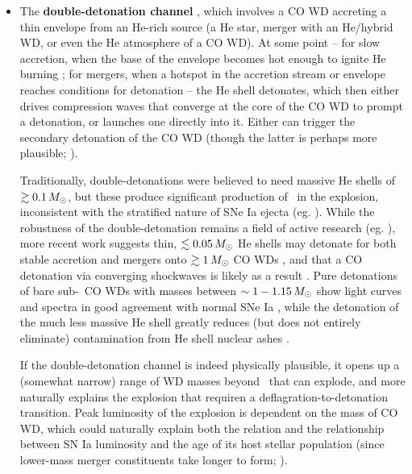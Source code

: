 \begin{itemize}


	\item The {\bf double-detonation channel} \citep{livn90, woosw94}, which involves a CO WD accreting a thin envelope from an He-rich source (a He star, merger with an He/hybrid WD, or even the He atmosphere of a CO WD).  At some point -- for slow accretion, when the base of the envelope becomes hot enough to ignite He burning  \citep{woosk11}; for mergers, when a hotspot in the accretion stream or envelope reaches conditions for detonation \citep{guil+10, rask+12, pakm+13} -- the He shell detonates, which then either drives compression waves that converge at the core of the CO WD to prompt a detonation, or launches one directly into it.  Either can trigger the secondary detonation of the CO WD (though the latter is perhaps more plausible; \citealt{mollw13}).  

Traditionally, double-detonations were believed to need massive He shells of $\gtrsim0.1\,\Msun$, but these produce significant production of \Ni\ in the explosion, inconsistent with the stratified nature of SNe Ia ejecta (eg. \citealt{krom+10,woosk11}).  While the robustness of the double-detonation remains a field of active research (eg. \citealt{woosk11, holc+13, shenm14, shenb14, dan+15}), more recent work suggests thin, $\lesssim0.05\,\Msun$ He shells may detonate for both stable accretion and mergers onto $\gtrsim1\,\Msun$ CO WDs \citep{woosk11, pakm+13, shenm14}, and that a CO detonation via converging shockwaves is likely as a result \citep{fink+10, mollw13, shenb14}.  Pure detonations of bare sub-\Mch\ CO WDs with masses between $\sim1-1.15\,\Msun$ show light curves and spectra in good agreement with normal SNe Ia \citep{shig+92, sim+10}, while the detonation of the much less massive He shell greatly reduces (but does not entirely eliminate) contamination from He shell nuclear ashes \citep{krom+10, hill+13}.


If the double-detonation channel is indeed physically plausible, it opens up a (somewhat narrow) range of WD masses beyond \Mch\ that can explode, and more naturally explains the explosion that requiren a deflagration-to-detonation transition.  Peak luminosity of the explosion is dependent on the mass of CO WD, which could naturally explain both the \cite{phil93} relation and the relationship between SN Ia luminosity and the age of its host stellar population (since lower-mass merger constituents take longer to form; \citealt{sim+10}).


\end{itemize}
